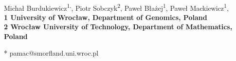 \documentclass[10pt,letterpaper]{article}
\date{}
\begin{document}
\vspace*{0.35in}

\begin{flushleft}
{\Large
\textbf{}
}
\newline
\\
Micha\l{}  Burdukiewicz\textsuperscript{1,\Yinyang},
Piotr Sobczyk\textsuperscript{2},
Pawe\l{} B\l{}a\.{z}ej\textsuperscript{1},
Pawe\l{} Mackiewicz\textsuperscript{1},
\\
\bigskip
\bf{1} University of Wroc\l{}aw, Department of Genomics, Poland
\\
\bf{2} Wroc\l{}aw University of Technology, Department of Mathematics, Poland
\\
\bigskip

% 
%
% 
% 
% 
% 

* pamac@smorfland.uni.wroc.pl

\end{flushleft}
\end{document}
